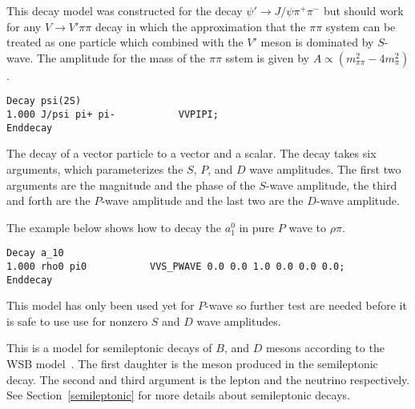 
\label{vvpipi}



\Expl
This decay model was constructed for the decay 
$\psi'\rightarrow J/\psi \pi^+\pi^-$ but should work
for any $V\rightarrow V' \pi\pi$ decay in which the
approximation that the $\pi\pi$ system can be treated
as one particle which combined with the $V'$ meson
is dominated by $S$-wave. The amplitude for the
mass of the $\pi\pi$ sstem is given by 
$A\propto (m^2_{\pi\pi}-4m^{2}_{\pi})$.

\Example
\begin{verbatim}
Decay psi(2S)
1.000 J/psi pi+ pi-           VVPIPI;
Enddecay
\end{verbatim}

\Notes






\label{vvspwave}



\Expl
The decay of a vector particle to a vector and a scalar. The decay
takes six arguments, which parameterizes the $S$, $P$, and $D$
wave amplitudes. The first two arguments are the magnitude 
and the phase of the $S$-wave amplitude, the third and forth
are the $P$-wave amplitude and the last two are the $D$-wave
amplitude. 

\Example
The example below shows how to decay the $a_1^0$ in pure 
$P$ wave to $\rho\pi$.
\begin{verbatim}
Decay a_10
1.000 rho0 pi0           VVS_PWAVE 0.0 0.0 1.0 0.0 0.0 0.0;
Enddecay
\end{verbatim}

\Notes
This model has only been used yet for $P$-wave so
further test are needed before it is safe to use use
for nonzero $S$ and $D$ wave amplitudes.






\label{wsb}



\Expl
This is a model for semileptonic decays of $B$, and $D$ mesons 
according to the WSB model~\cite{Wirbel85}. The first daughter
is the meson produced in the semileptonic decay. The second and third
argument is the lepton and the neutrino respectively.
See Section~\ref{semileptonic} for more details about semileptonic
decays.



